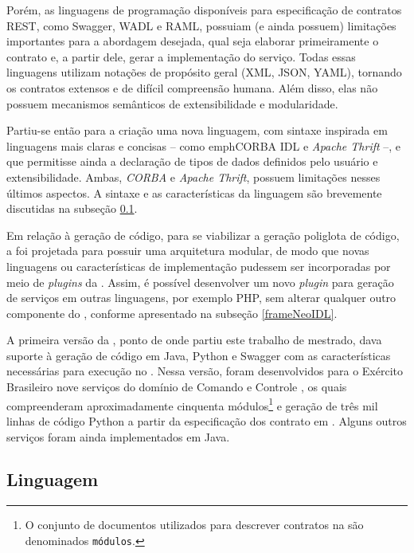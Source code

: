 Porém, as linguagens de programação disponíveis para especificação de
contratos REST, como Swagger\cite{swaggerSite}, WADL\cite{hadley2006web} e
RAML\cite{RAML}, possuiam (e ainda possuem) limitações importantes para a
abordagem desejada, qual seja elaborar primeiramente o contrato e, a
partir dele, gerar a implementação do serviço. Todas essas linguagens utilizam
notações de propósito geral (XML\cite{XML}, JSON\cite{JSon}, YAML\cite{YAML}),
tornando os contratos extensos e de difícil compreensão humana. Além disso,
elas não possuem mecanismos semânticos de extensibilidade e modularidade.

Partiu-se então para a criação uma nova linguagem, com sintaxe
inspirada em linguagens mais claras e concisas -- como emph{CORBA
IDL}\texttrademark \cite{corba} e \emph{Apache
Thrift}\texttrademark\cite{thrift} --, e que permitisse ainda a declaração de
tipos de dados definidos pelo usuário e extensibilidade. Ambas, \emph{CORBA} e
\emph{Apache Thrift}, possuem limitações nesses últimos aspectos. A sintaxe e as
características da linguagem \neoidl{} são brevemente discutidas na subseção
\ref{linguagemNeoIDL}.

Em relação à geração de código, para se viabilizar a geração poliglota de
código, a \neoidl{} foi projetada para possuir uma arquitetura modular, de modo
que novas linguagens ou características de implementação pudessem ser
incorporadas por meio de \textit{plugins} da \neoidl{}. Assim, é possível desenvolver um novo \textit{plugin} para geração de serviços em outras
linguagens, por exemplo PHP, sem alterar qualquer outro componente do \framework,
conforme apresentado na subseção \ref{frameNeoIDL}.

A primeira versão da \neoidl{}, ponto de onde partiu este trabalho de mestrado,
dava suporte à geração de código em Java, Python e Swagger com as
características necessárias para execução no \neocortex{}. Nessa versão, foram
desenvolvidos para o Exército Brasileiro nove serviços do domínio de Comando e
Controle \cite{david:commandControl}, os quais compreenderam aproximadamente
cinquenta módulos\footnote{O conjunto de documentos
utilizados para descrever contratos na \neoidl{} são denominados
\texttt{módulos}.} e geração de três mil linhas de código Python a partir
da especificação dos contrato em \neoidl{}. Alguns outros serviços foram
ainda implementados em Java.



\subsection{Linguagem}
\label{linguagemNeoIDL}
\vspace{-6mm}

